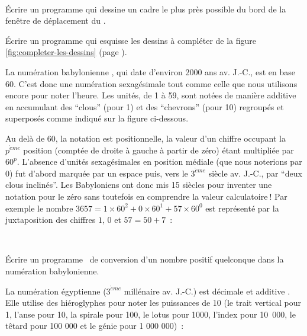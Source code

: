 \noindent\begin{exercices}{\ \\

\tiret Écrire un programme qui dessine un cadre le plus près possible du bord de la fenêtre de déplacement
du \robot.

\tiret Écrire un programme qui esquisse les dessins à  compléter de la figure \ref{fig:completer-les-dessins} 
(page \pageref{fig:completer-les-dessins}).

\tiret La numération babylonienne \cite{guitel}, qui date d'environ 2000 ans av. J.-C., est en
base 60. C'est donc une numération sexagésimale tout comme celle que nous utilisons encore
pour noter l'heure. Les unités, de 1 à 59, sont notées de manière additive en accumulant des ``clous'' (pour
1) et des ``chevrons'' (pour 10) regroupés et superposés comme indiqué sur la figure
ci-dessous.\\[3.9cm]
\noindent{}%

\noindent Au delà de 60, la notation est positionnelle, la valeur d'un chiffre occupant
la $p^{\grave{e}me}$ position (comptée de droite à gauche à partir de zéro) étant
multipliée par $60^{p}$. L'absence d'unités sexagésimales en position médiale (que
nous no\-te\-rions par 0) fut d'abord marquée par un espace puis, vers le $3^{\grave{e}me}$
siècle av. J.-C., par ``deux clous inclinés''. Les Babyloniens ont donc mis 15 siècles pour
inventer une notation pour le
zéro sans toutefois en comprendre la valeur calculatoire$\:$! Par exemple 
le nombre $3657 = 1 \times 60^{2} + 0 \times 60^{1} + 57 \times 60^{0}$
est représenté par la juxtaposition des chiffres $1$, $0$ et 
$57 = 50 + 7$~:

\pagebreak
\mbox{}\\[1.9cm]
\noindent{}%

Écrire un programme \python\ de conversion
d'un nombre po\-si\-tif quel\-con\-que dans la nu\-mé\-ra\-tion babylonienne. 

\tiret La numération égyptienne ($3^{\grave{e}me}$ 
millénaire av. J.-C.) est décimale et additive \cite{guitel}. Elle utilise des hiéroglyphes pour 
noter les
puissances de 10 (le trait vertical pour 1, l'anse pour 10, la spirale pour 100, le lotus pour 1000,
l'index pour 10~000,
le têtard pour 100 000 et le génie pour 1 000 000)~:\\[3.0cm]

}
\end{exercices}
